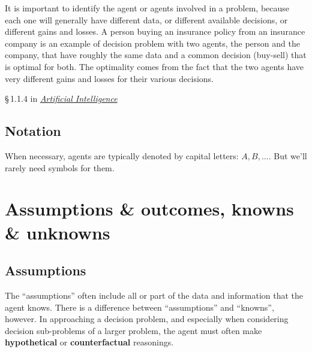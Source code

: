 \documentclass[
  a4paper,
  DIV=11,
  numbers=noendperiod,
  oneside]{scrreprt}
\begin{document}
It is important to identify the agent or agents involved in a problem,
because each one will generally have different data, or different
available decisions, or different gains and losses. A person buying an
insurance policy from an insurance company is an example of decision
problem with two agents, the person and the company, that have roughly
the same data and a common decision (buy-sell) that is optimal for both.
The optimality comes from the fact that the two agents have very
different gains and losses for their various decisions.

\begin{tcolorbox}[enhanced jigsaw, titlerule=0mm, toprule=.15mm, toptitle=1mm, bottomrule=.15mm, leftrule=.75mm, title={\faIcon{book-open} Reading}, arc=.35mm, breakable, left=2mm, coltitle=black, colframe=quarto-callout-caution-color-frame, colbacktitle=quarto-callout-caution-color!10!white, bottomtitle=1mm, rightrule=.15mm, opacitybacktitle=0.6, opacityback=0, colback=white]

§\,1.1.4 in
\href{https://hvl.instructure.com/courses/25074/modules/items/660089}{\emph{Artificial
Intelligence}}

\end{tcolorbox}

\hypertarget{notation}{%
\subsection{Notation}\label{notation}}

When necessary, agents are typically denoted by capital letters:
{\(A, B,\dotsc\).} But we'll rarely need symbols for them.

\hypertarget{assumptions-outcomes-knowns-unknowns}{%
\section{Assumptions \& outcomes, knowns \&
unknowns}\label{assumptions-outcomes-knowns-unknowns}}

\hypertarget{assumptions}{%
\subsection{Assumptions}\label{assumptions}}

The ``assumptions'' often include all or part of the data and
information that the agent knows. There is a difference between
``assumptions'' and ``knowns'', however. In approaching a decision
problem, and especially when considering decision sub-problems of a
larger problem, the agent must often make \textbf{hypothetical} or
\textbf{counterfactual} reasonings.
\end{document}
